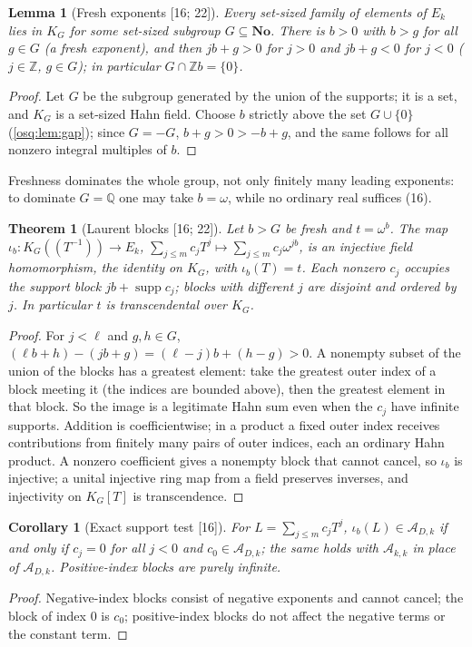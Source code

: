 \documentclass[11pt,letterpaper]{article}
\numberwithin{equation}{section}
\newtheorem{theorem}{Theorem}[section]
\newtheorem{lemma}[lemma]{Lemma}
\newtheorem{corollary}[corollary]{Corollary}
\theoremstyle{definition}
\theoremstyle{remark}
\theoremstyle{plain}
\newcommand{\No}{\mathbf{No}}
\newcommand{\Z}{\mathbb Z}
\newcommand{\Q}{\mathbb Q}
\newcommand{\A}{\mathcal A}          %
\newcommand{\supp}{\operatorname{supp}}
\newcommand{\src}[1]{\textup{\textsf{[#1]}}}
\begin{document}
\begin{lemma}[Fresh exponents \src{16; 22}]\label{osq:fs:lem:fresh}
Every set-sized family of elements of $E_k$ lies in $K_G$ for some set-sized subgroup $G\subseteq\No$. There is $b>0$ with
$b>g$ for all $g\in G$ (a \emph{fresh} exponent), and then $jb+g>0$ for $j>0$ and $jb+g<0$ for $j<0$ ($j\in\Z$, $g\in G$); in
particular $G\cap\Z b=\{0\}$.
\end{lemma}
\begin{proof}
Let $G$ be the subgroup generated by the union of the supports; it is a set, and $K_G$ is a set-sized Hahn field. Choose
$b$ strictly above the set $G\cup\{0\}$ (\cref{osq:lem:gap}); since $G=-G$, $b+g>0>-b+g$, and the same follows for all
nonzero integral multiples of $b$.
\end{proof}

Freshness dominates the whole group, not only finitely many leading exponents: to dominate $G=\Q$ one may take $b=\omega$,
while no ordinary real suffices (16).

\begin{theorem}[Laurent blocks \src{16; 22}]\label{osq:fs:thm:embedding}
Let $b>G$ be fresh and $t=\omega^b$. The map
$\iota_b:K_G(\!(T^{-1})\!)\to E_k$, $\sum_{j\le m}c_jT^j\mapsto\sum_{j\le m}c_j\omega^{jb}$, is an injective field
homomorphism, the identity on $K_G$, with $\iota_b(T)=t$. Each nonzero $c_j$ occupies the support block $jb+\supp c_j$; blocks
with different $j$ are disjoint and ordered by $j$. In particular $t$ is transcendental over $K_G$.
\end{theorem}
\begin{proof}
For $j<\ell$ and $g,h\in G$, $(\ell b+h)-(jb+g)=(\ell-j)b+(h-g)>0$. A nonempty subset of the union of the blocks has a greatest
element: take the greatest outer index of a block meeting it (the indices are bounded above), then the greatest element in that
block. So the image is a legitimate Hahn sum even when the $c_j$ have infinite supports. Addition is coefficientwise; in a product
a fixed outer index receives contributions from finitely many pairs of outer indices, each an ordinary Hahn product. A nonzero
coefficient gives a nonempty block that cannot cancel, so $\iota_b$ is injective; a unital injective ring map from a field preserves
inverses, and injectivity on $K_G[T]$ is transcendence.
\end{proof}

\begin{corollary}[Exact support test \src{16}]\label{osq:fs:cor:blocktest}
For $L=\sum_{j\le m}c_jT^j$, $\iota_b(L)\in\A_{D,k}$ if and only if $c_j=0$ for all $j<0$ and $c_0\in\A_{D,k}$; the same holds with
$\A_{k,k}$ in place of $\A_{D,k}$. Positive-index blocks are purely infinite.
\end{corollary}
\begin{proof}
Negative-index blocks consist of negative exponents and cannot cancel; the block of index $0$ is $c_0$; positive-index blocks do not
affect the negative terms or the constant term.
\end{proof}
\end{document}
